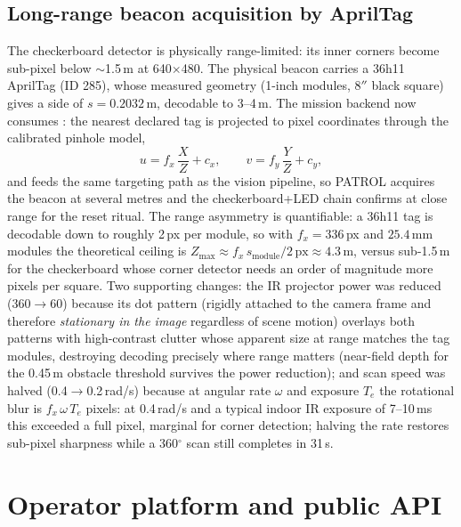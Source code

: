 \subsection{Long-range beacon acquisition by AprilTag}
The checkerboard detector is physically range-limited: its inner corners
become sub-pixel below $\sim$1.5\,m at 640$\times$480. The physical beacon
carries a 36h11 AprilTag (ID 285), whose measured geometry (1-inch modules,
$8''$ black square) gives a side of $s = 0.2032$\,m, decodable to
3--4\,m. The mission backend now consumes : the
nearest declared tag is projected to pixel coordinates through the calibrated
pinhole model,
\begin{equation}
u = f_x\,\frac{X}{Z} + c_x, \qquad v = f_y\,\frac{Y}{Z} + c_y,
\end{equation}
and feeds the same targeting path as the vision pipeline, so PATROL acquires
the beacon at several metres and the checkerboard+LED chain confirms at close
range for the reset ritual. The range asymmetry is quantifiable: a 36h11 tag
is decodable down to roughly 2\,px per module, so with $f_x = 336$\,px and
$25.4$\,mm modules the theoretical ceiling is
$Z_{\max} \approx f_x\,s_{\mathrm{module}}/2\,\text{px} \approx 4.3$\,m,
versus sub-1.5\,m for the checkerboard whose corner detector needs an order
of magnitude more pixels per square. Two supporting changes: the IR projector
power was reduced (360$\rightarrow$60) because its dot pattern (rigidly
attached to the camera frame and therefore \emph{stationary in the image}
regardless of scene motion) overlays both patterns with high-contrast
clutter whose apparent size at range matches the tag modules, destroying
decoding precisely where range matters (near-field depth for the 0.45\,m
obstacle threshold survives the power reduction); and scan speed was halved
(0.4$\rightarrow$0.2\,rad/s) because at angular rate $\omega$ and exposure
$T_e$ the rotational blur is $f_x\,\omega\,T_e$ pixels:
at 0.4\,rad/s and a typical indoor IR exposure of 7--10\,ms this exceeded a
full pixel, marginal for corner detection; halving the rate restores
sub-pixel sharpness while a 360$^\circ$ scan still completes in 31\,s.

\section{Operator platform and public API}
\label{sec:web}

